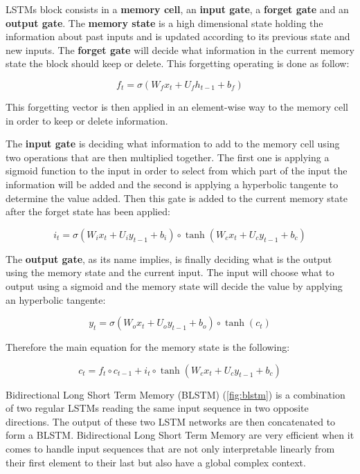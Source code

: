 \documentclass[master, tikz, final,11pt, dvipdfmx]{iscs-thesis}
\begin{document}
LSTMs block consists in a \textbf{memory cell}, an \textbf{input gate}, a \textbf{forget gate} and an \textbf{output gate}.
The \textbf{memory state} is a high dimensional state holding the information about past inputs and is updated according to its previous state and new inputs.
The \textbf{forget gate} will decide what information in the current memory state the block should keep or delete. This forgetting operating is done as follow:

\[f_t = \sigma(W_{f} x_t + U_{f} h_{t-1} + b_f)\]

This forgetting vector is then applied in an element-wise way to the memory cell in order to keep or delete information.

The \textbf{input gate} is deciding what information to add to the memory cell using two operations that are then multiplied together. The first one is applying a sigmoid function to the input in order to select from which part of the input the information will be added and the second is applying a hyperbolic tangente to determine the value added. Then this gate is added to the current memory state after the forget state has been applied:

\[i_t = \sigma(W_{i} x_t + U_{i} y_{t-1} + b_i) \circ \tanh(W_{c} x_t + U_{c} y_{t-1} + b_c)\]

The \textbf{output gate}, as its name implies, is finally deciding what is the output using the memory state and the current input. The input will choose what to output using a sigmoid and the memory state will decide the value by applying an hyperbolic tangente:

\[y_t = \sigma(W_{o} x_t + U_{o} y_{t-1} + b_o) \circ \tanh(c_t)\]

Therefore the main equation for the memory state is the following:

\[c_t = f_t \circ c_{t-1} + i_t \circ \tanh(W_{c} x_t + U_{c} y_{t-1} + b_c)\]

Bidirectional Long Short Term Memory (BLSTM) (\autoref{fig:blstm}) is a combination of two regular LSTMs reading the same input sequence in two opposite directions. The output of these two LSTM networks are then concatenated to form a BLSTM. Bidirectional Long Short Term Memory are very efficient when it comes to handle input sequences that are not only interpretable linearly from their first element to their last but also have a global complex context.
\end{document}
